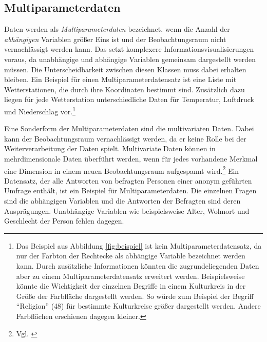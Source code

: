 \documentclass[a4paper, 
               12pt,
               DIV=calc,
               version=first,
               pdftex,
               headsepline,
               footsepline,
               bibtotocnumbered,
               liststotocnumbered]{scrreprt}
\begin{document}
\subsection{Multiparameterdaten}
Daten werden als \textit{Multiparameterdaten} bezeichnet, wenn die Anzahl der \textit{abhängigen} Variablen größer Eins ist
und der Beobachtungsraum nicht vernachlässigt werden kann. Das setzt komplexere
Informationsvisualisierungen voraus, da unabhängige und abhängige Variablen gemeinsam
dargestellt werden müssen. Die Unterscheidbarkeit zwischen diesen Klassen muss dabei
erhalten bleiben.
Ein Beispiel für einen Multiparameterdatensatz ist eine Liste mit Wetterstationen, die durch ihre
Koordinaten bestimmt sind. Zusätzlich dazu liegen für jede Wetterstation unterschiedliche
Daten für Temperatur, Luftdruck und Niederschlag vor.\footnote{Das Beispiel aus Abbildung
\ref{fig:beispiel} ist kein Multiparameterdatensatz, da nur der Farbton der Rechtecke als
abhängige Variable bezeichnet werden kann. Durch zusätzliche Informationen könnten die
zugrundeliegenden Daten aber zu einem Multiparameterdatensatz erweitert werden. Beispielsweise
könnte die Wichtigkeit der einzelnen Begriffe in einem Kulturkreis in der Größe der
Farbfläche dargestellt werden. So würde zum Beispiel der Begriff "`Religion"' (48) für
bestimmte Kulturkreise größer dargestellt werden. Andere Farbflächen erschienen dagegen
kleiner.}

Eine Sonderform der Multiparameterdaten sind die multivariaten Daten. Dabei kann
der Beobachtungsraum vernachlässigt werden, da er keine Rolle bei der Weiterverarbeitung
der Daten spielt. Multivariate Daten können in mehrdimensionale Daten überführt werden,
wenn für jedes vorhandene Merkmal eine Dimension in einem neuen Beobachtungsraum
aufgespannt wird.\footnote{Vgl. \citep[S.\,172]{Schumann}} Ein Datensatz, der alle
Antworten von befragten Personen einer anonym geführten Umfrage enthält, ist ein Beispiel
für Multiparameterdaten. Die einzelnen Fragen sind die abhängigen Variablen und
die Antworten der Befragten sind deren Ausprägungen. Unabhängige Variablen wie beispielsweise
Alter, Wohnort und Geschlecht der Person fehlen dagegen.
\end{document}
